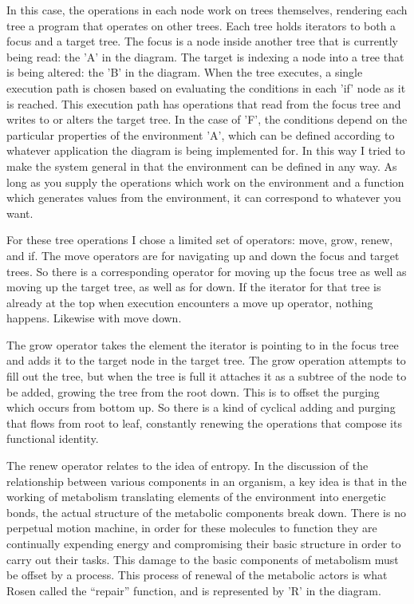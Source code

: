 \documentclass[12pt]{article}
\begin{document}
In this case, the operations in each node work on trees themselves, rendering each tree a program that operates on other trees.  Each tree holds iterators to both a focus and a target tree.  The focus is a node inside another tree that is currently being read: the 'A' in the diagram.   The target is indexing a node into a tree that is being altered: the 'B' in the diagram.  When the tree executes, a single execution path is chosen based on evaluating the conditions in each 'if' node as it is reached.  This execution path has operations that read from the focus tree and writes to or alters the target tree.  In the case of 'F', the conditions depend on the particular properties of the environment 'A', which can be defined according to whatever application the diagram is being implemented for.  In this way I tried to make the system general in that the environment can be defined in any way.  As long as you supply the operations which work on the environment and a function which generates values from the environment, it can correspond to whatever you want.  

For these tree operations I chose a limited set of operators: move, grow, renew, and if.  The move operators are for navigating up and down the focus and target trees.  So there is a corresponding operator for moving up the focus tree as well as moving up the target tree, as well as for down.  If the iterator for that tree is already at the top when execution encounters a move up operator, nothing happens.  Likewise with move down.  

The grow operator takes the element the iterator is pointing to in the focus tree and adds it to the target node in the target tree. The grow operation attempts to fill out the tree, but when the tree is full it attaches it as a subtree of the node to be added, growing the tree from the root down.  This is to offset the purging which occurs from bottom up.  So there is a kind of cyclical adding and purging that flows from root to leaf, constantly renewing the operations that compose its functional identity.

The renew operator relates to the idea of entropy.  In the discussion of the relationship between various components in an organism, a key idea is that in the working of metabolism translating elements of the environment into energetic bonds, the actual structure of the metabolic components break down.  There is no perpetual motion machine, in order for these molecules to function they are continually expending energy and compromising their basic structure in order to carry out their tasks.  This damage to the basic components of metabolism must be offset by a process.  This process of renewal of the metabolic actors is what Rosen called the ``repair'' function, and is represented by 'R' in the diagram.  
\end{document}
